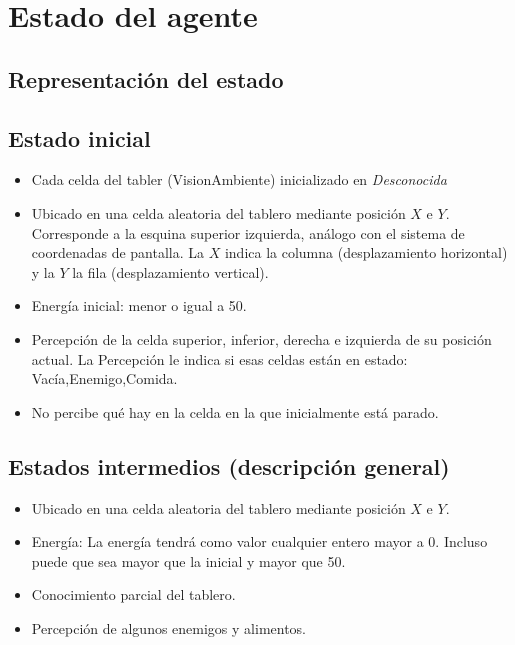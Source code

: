 \section{Estado del agente}

\subsection{Representación del estado}

\subsection{Estado inicial}

\begin{itemize}
\item Cada celda del tabler (VisionAmbiente) inicializado en \textit{Desconocida}
\item Ubicado en una celda aleatoria del tablero mediante posición $X$ e $Y$. Corresponde a la esquina superior izquierda, análogo con el sistema de coordenadas de pantalla. La $X$ indica la columna (desplazamiento horizontal) y la $Y$ la fila (desplazamiento vertical).
\item Energía inicial: menor o igual a 50.
\item Percepción de la celda superior, inferior, derecha e izquierda de su posición actual. La Percepción le indica si esas celdas están en estado: Vacía,Enemigo,Comida.
\item No percibe qué hay en la celda en la que inicialmente está parado.
\end{itemize}

\subsection{Estados intermedios (descripción general)}

\begin{itemize}
\item Ubicado en una celda aleatoria del tablero mediante posición $X$ e $Y$.
\item Energía: La energía tendrá como valor cualquier entero mayor a 0. Incluso puede que sea mayor que la inicial y mayor que 50.
\item Conocimiento parcial del tablero.
\item Percepción de algunos enemigos y alimentos.
\end{itemize}

